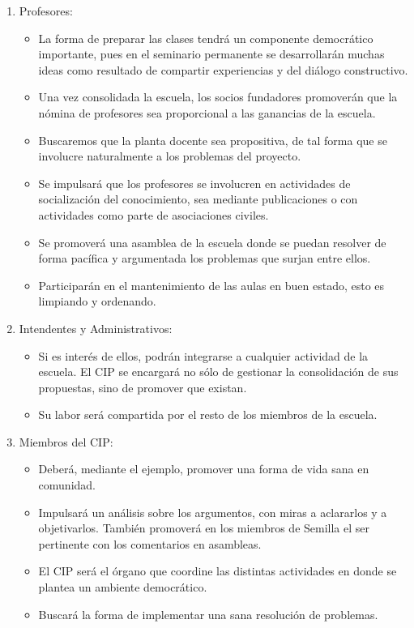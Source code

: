 \documentclass[10pt,letterpaper,oneside]{book}
\begin{document}
\begin{enumerate}[label=\Alph*]
			\item Profesores: 
			\begin{itemize}
			\item La forma de preparar las clases tendrá un componente democrático importante, pues en el seminario permanente se desarrollarán muchas ideas como resultado de compartir experiencias y del diálogo constructivo.
			\item Una vez consolidada la escuela, los socios fundadores promoverán que la nómina de profesores sea proporcional a las ganancias de la escuela.
			\item Buscaremos que la planta docente sea propositiva, de tal forma que se involucre naturalmente a los problemas del proyecto.
			\item Se impulsará que los profesores se involucren en actividades de socialización del conocimiento, sea mediante publicaciones o con actividades como parte de asociaciones civiles.
			\item Se promoverá una asamblea de la escuela donde se puedan resolver de forma pacífica y argumentada los problemas que surjan entre ellos.
			\item Participarán en el mantenimiento de las aulas en buen estado, esto es limpiando y ordenando.
\end{itemize}						
			
			\item Intendentes y Administrativos: 
\begin{itemize}
			\item Si es interés de ellos, podrán integrarse a cualquier actividad de la escuela. El CIP se encargará no sólo de gestionar la consolidación de sus propuestas, sino de promover que existan.
			\item Su labor será compartida por el resto de los miembros de la escuela.
\end{itemize}			
			
			\item Miembros del CIP: 
			\begin{itemize}
			\item Deberá, mediante el ejemplo, promover una forma de vida sana en comunidad.
			\item Impulsará un análisis sobre los argumentos, con miras a aclararlos y a objetivarlos. También promoverá en los miembros de Semilla el ser pertinente con los comentarios en asambleas.
			\item El CIP será el órgano que coordine las distintas actividades en donde se plantea un ambiente democrático.
			\item Buscará la forma de implementar una sana resolución de problemas.
\end{itemize}
			\end{enumerate}
\end{document}
